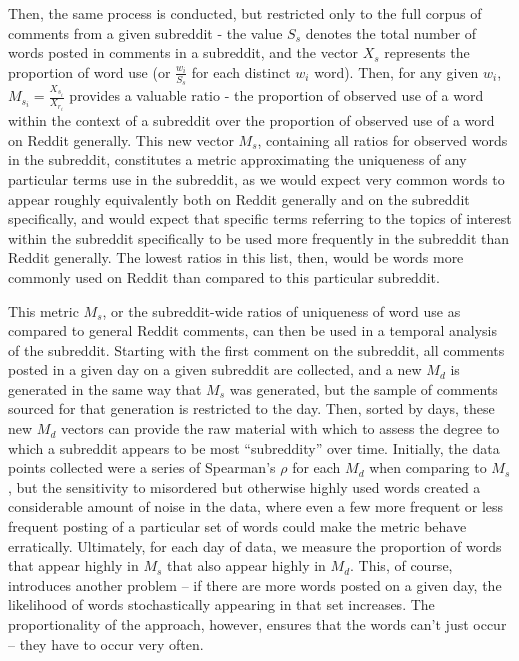 \documentclass[letterpaper,12pt]{article}
\begin{document}
Then, the same process is conducted, but restricted only to the full corpus of comments from a given subreddit - the value $S_s$ denotes the total number of words posted in comments in a subreddit, and the vector $X_s$ represents the proportion of word use (or $\frac{w_i}{S_s}$ for each distinct $w_i$ word). Then, for any given $w_i$, $M_{s_i} = \frac{X_{s_i}}{X_{r_i}}$ provides a valuable ratio - the proportion of observed use of a word within the context of a subreddit over the proportion of observed use of a word on Reddit generally. This new vector $M_s$, containing all ratios for observed words in the subreddit, constitutes a metric approximating the uniqueness of any particular terms use in the subreddit, as we would expect very common words to appear roughly equivalently both on Reddit generally and on the subreddit specifically, and would expect that specific terms referring to the topics of interest within the subreddit specifically to be used more frequently in the subreddit than Reddit generally. The lowest ratios in this list, then, would be words more commonly used on Reddit than compared to this particular subreddit.

This metric $M_s$, or the subreddit-wide ratios of uniqueness of word use as compared to general Reddit comments, can then be used in a temporal analysis of the subreddit. Starting with the first comment on the subreddit, all comments posted in a given day on a given subreddit are collected, and a new $M_d$ is generated in the same way that $M_s$ was generated, but the sample of comments sourced for that generation is restricted to the day. Then, sorted by days, these new $M_d$ vectors can provide the raw material with which to assess the degree to which a subreddit appears to be most ``subreddity'' over time. Initially, the data points collected were a series of Spearman's $\rho$ for each $M_d$ when comparing to $M_s$, but the sensitivity to misordered but otherwise highly used words created a considerable amount of noise in the data, where even a few more frequent or less frequent posting of a particular set of words could make the metric behave erratically. Ultimately, for each day of data, we measure the proportion of words that appear highly in $M_s$ that also appear highly in $M_d$. This, of course, introduces another problem -- if there are more words posted on a given day, the likelihood of words stochastically appearing in that set increases. The proportionality of the approach, however, ensures that the words can't just occur -- they have to occur very often.



\end{document}
